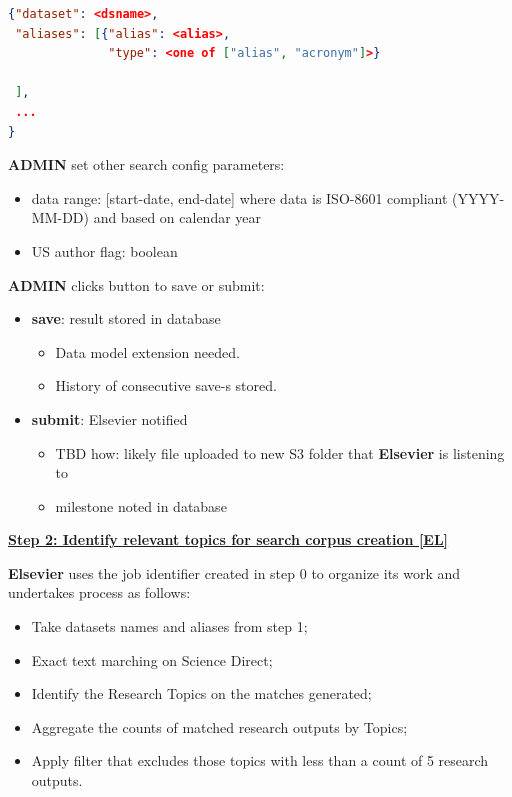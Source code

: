 \documentclass[titlepage, 11pt]{article}
\begin{document}
{\hspace{1cm}
\begin{minipage}{\textwidth}

\begin{lstlisting}[language=json, firstnumber=1]
{"dataset": <dsname>,
 "aliases": [{"alias": <alias>,
              "type": <one of ["alias", "acronym"]>}
 
 ],
 ...
}
\end{lstlisting}
\end{minipage}

\textbf{ADMIN} set other search config parameters:
\begin{itemize}
    \item data range: [start-date, end-date] where data is ISO-8601 compliant (YYYY-MM-DD) and based on calendar year
    \item US author flag: boolean
\end{itemize}

\textbf{ADMIN} clicks button to save or submit:
\begin{itemize}
    \item \textbf{save}: result stored in database \begin{itemize}
        \item Data model extension needed.
        \item History of consecutive save-s stored.
    \end{itemize}
    \item \textbf{submit}: Elsevier notified \begin{itemize}
        \item TBD how: likely file uploaded to new S3 folder that \textbf{Elsevier} is listening to
        \item milestone noted in database
    \end{itemize}
\end{itemize}

\bigskip
\underline{\textbf{Step 2: Identify relevant topics for search corpus creation [EL]}}

\textbf{Elsevier} uses the job identifier created in step 0 to organize its work and undertakes process as follows: 
\begin{itemize}
    \item Take datasets names and aliases from step 1;
    \item Exact text marching on Science Direct;
    \item Identify the Research Topics on the matches generated;
    \item Aggregate the counts of matched research outputs by Topics;
    \item Apply filter that excludes those topics with less than a count of 5 research outputs.
\end{itemize}

}
\end{document}
